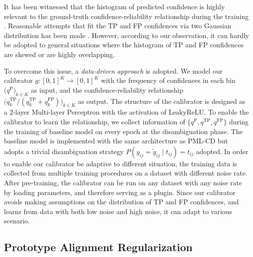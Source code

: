 \documentclass[letterpaper]{article} %
\begin{document}
  It has been witnessed that the histogram of predicted confidence is highly relevant to the ground-truth confidence-reliability relationship during the training \cite{CLC,UNM}. 
  Reasonable attempts that fit the TP and FP confidences via two Gaussian distribution has been made \cite{CLC}. However, according to our observation, it can hardly be adopted to general situations where the histogram of TP and FP confidences are skewed or are highly overlapping. 

  To overcome this issue, a \textit{data-driven approach} is adopted. We model our calibrator \( g: [0, 1]^K \rightarrow [0, 1]^K \) with the frequency of confidences in each bin \(\bigl(q^\text{P}\bigr)_{k \in K}\) as input, and the confidence-reliability relationship $\bigl(q^\text{TP}_k / (q^\text{TP}_k + q^\text{FP}_k )\bigr)_{k \in K}$ as output. The structure of the calibrator is designed as a 2-layer Multi-layer Perceptron with the activation of LeakyReLU. 
  To enable the calibrator to learn the relationship, we collect information of $\{q^\text{P}, q^\text{TP}, q^\text{FP} \}$ during the training of baseline model on every epoch at the disambiguation phase. The baseline model is implemented with the same architecture as PML-CD but adopts a trivial disambiguation strategy $P(y_{ij} = \tilde y_{ij} \mid t_{ij}) = t_{ij}$ adopted. In order to enable our calibrator be adaptive to different situation, the training data is collected from multiple training procedures on a dataset with different noise rate. After pre-training, the calibrator can be run on any dataset with any noise rate by loading parameters, and therefore serving as a plugin. 
  Since our calibrator avoids making assumptions on the distribution of TP and FP confidences, and learns from data with both low noise and high noise, it can adapt to various scenario. 


\subsection{Prototype Alignment Regularization}
\end{document}
